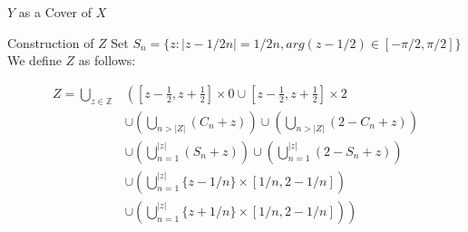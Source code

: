 \documentclass[14pt]{beamer}
\begin{document}
\begin{frame}{$Y$ as a Cover of $X$}
\begin{center}

  

\end{center}
\end{frame}


\begin{frame}{Construction of $Z$}
Set \textcolor{colororange}{$S_n=\{z:|z-1/2n|=1/2n,arg(z-1/2)\in[-\pi/2,\pi/2]\}$}
We define \textcolor{colororange}{$Z$} as follows:
\begin{footnotesize}
    \textcolor{colororange}{
    \begin{align*}
      Z=\bigcup_{z\in\mathbb{Z}}&\left(\left[z-\frac{1}{2},z+\frac{1}{2}\right]\times{0}\cup\left[z-\frac{1}{2},z+\frac{1}{2}\right]\times{2}\right.\\
      &\cup\left(\bigcup_{n>|Z|}(C_n+z)\right)\cup\left(\bigcup_{n>|Z|}(2-C_n+z)\right)\\
      &\cup\left(\bigcup_{n=1}^{|z|}(S_n+z)\right)\cup\left(\bigcup_{n=1}^{|z|}(2-S_n+z)\right)\\
      &\cup\left(\bigcup_{n=1}^{|z|}\{z-1/n\}\times [1/n,2-1/n]\right)\\
      &\left.\cup\left(\bigcup_{n=1}^{|z|}\{z+1/n\}\times [1/n,2-1/n]\right)\right)\\
    \end{align*}}
\end{footnotesize}
\end{frame}
\end{document}

